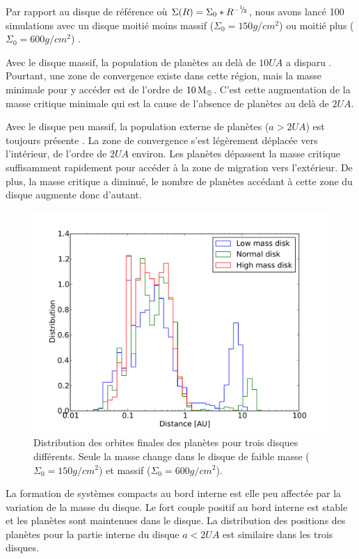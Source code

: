 Par rapport au disque de référence où $\Sigma(R) = \Sigma_0 * R^{-{{}^{1\!\!}/ _{\!2}}}$, nous avons lancé 100 simulations avec un disque moitié moins massif ($\Sigma_0=150\unit{g/cm^2}$) ou moitié plus ($\Sigma_0=600\unit{g/cm^2}$) .

Avec le disque massif, la population de planètes au delà de $10\unit{UA}$ a disparu . Pourtant, une zone de convergence existe dans cette région, mais la masse minimale pour y accéder est de l'ordre de $10\mathrm{\thinspace M_\oplus}$. C'est cette augmentation de la masse critique minimale qui est la cause de l'absence de planètes au delà de $2\unit{UA}$.

Avec le disque peu massif, la population externe de planètes ($a>2\unit{UA}$) est toujours présente . La zone de convergence s'est légèrement déplacée vers l'intérieur, de l'ordre de $2\unit{UA}$ environ. Les planètes dépassent la masse critique suffisamment rapidement pour accéder à la zone de migration vers l'extérieur. De plus, la masse critique a diminué, le nombre de planètes accédant à cette zone du disque augmente donc d'autant.

\begin{figure}[htbp]
\centering
\includegraphics[width=0.8\linewidth]{figure/HSE/hist_a_disk.pdf}
\caption{Distribution des orbites finales des planètes pour trois disques différents. Seule la masse change dans le disque de faible masse ($\Sigma_0=150\unit{g/cm^2}$) et massif ($\Sigma_0=600\unit{g/cm^2}$).}\label{fig:HSE_hist_a_disk}
\end{figure}

La formation de systèmes compacts au bord interne est elle peu affectée par la variation de la masse du disque. Le fort couple positif au bord interne est stable et les planètes sont maintenues dans le disque. La distribution des positions des planètes pour la partie interne du disque $a<2\unit{UA}$ est similaire dans les trois disques. 

